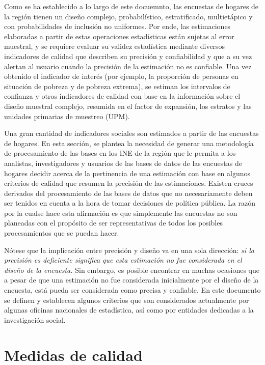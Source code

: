 \documentclass[
  10pt,
  spanish,
]{book}
\begin{document}
Como se ha establecido a lo largo de este docuemnto, las encuestas de hogares de la región tienen un diseño complejo, probabilístico, estratificado, multietápico y con probabilidades de inclusión no uniformes. Por ende, las estimaciones elaboradas a partir de estas operaciones estadísticas están sujetas al error muestral, y se requiere evaluar su validez estadística mediante diversos indicadores de calidad que describen su precisión y confiabilidad y que a su vez alertan al usuario cuando la precisión de la estimación no es confiable. Una vez obtenido el indicador de interés (por ejemplo, la proporción de personas en situación de pobreza y de pobreza extrema), se estiman los intervalos de confianza y otros indicadores de calidad con base en la información sobre el diseño muestral complejo, resumida en el factor de expansión, los estratos y las unidades primarias de muestreo (UPM).

Una gran cantidad de indicadores sociales son estimados a partir de las encuestas de hogares. En esta sección, se plantea la necesidad de generar una metodología de procesamiento de las bases en los INE de la región que le permita a los analistas, investigadores y usuarios de las bases de datos de las encuestas de hogares decidir acerca de la pertinencia de una estimación con base en algunos criterios de calidad que resumen la precisión de las estimaciones. Existen cruces derivados del procesamiento de las bases de datos que no necesariamente deben ser tenidos en cuenta a la hora de tomar decisiones de política pública. La razón por la cualse hace esta afirmación es que simplemente las encuestas no son planeadas con el propósito de ser representativas de todos los posibles procesamientos que se puedan hacer.

Nótese que la implicación entre precisión y diseño va en una sola dirección: \emph{si la precisión es deficiente significa que esta estimación no fue considerada en el diseño de la encuesta.} Sin embargo, es posible encontrar en muchas ocasiones que a pesar de que una estimación no fue considerada inicialmente por el diseño de la encuesta, está pueda ser considerada como precisa y confiable. En este documento se definen y establecen algunos criterios que son considerados actualmente por algunas oficinas nacionales de estadística, así como por entidades dedicadas a la investigación social.

\hypertarget{medidas-de-calidad}{%
\section{Medidas de calidad}\label{medidas-de-calidad}}
\end{document}
